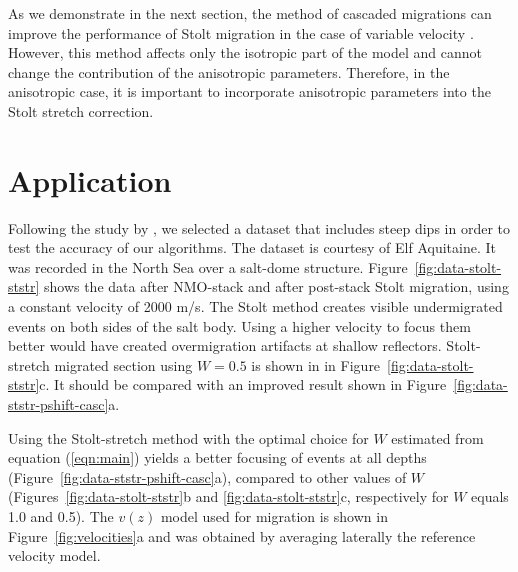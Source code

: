 As we demonstrate in the next section, the method of cascaded
migrations \cite{GEO52.05.06180643} can improve the performance of
Stolt migration in the case of variable velocity
\cite{GEO53.07.08810893}.  However, this method affects only the
isotropic part of the model and cannot change the contribution of the
anisotropic parameters.  Therefore, in the anisotropic case, it is
important to incorporate anisotropic parameters into the Stolt stretch
correction.

\section{Application}

Following the study by , we selected a
dataset that includes steep dips in order to test the accuracy of our
algorithms. The dataset is courtesy of Elf Aquitaine.  It was recorded
in the North Sea over a salt-dome structure.
Figure~\ref{fig:data-stolt-ststr} shows the data after NMO-stack and
after post-stack Stolt migration, using a constant velocity of 2000
m/s. The Stolt method creates visible undermigrated events on both
sides of the salt body. Using a higher velocity to focus them better
would have created overmigration artifacts at shallow reflectors.
Stolt-stretch migrated section using $W=0.5$ is shown in in
Figure~\ref{fig:data-stolt-ststr}c. It should be compared with an
improved result shown in Figure~\ref{fig:data-ststr-pshift-casc}a.
\par
Using the Stolt-stretch method with the optimal choice for $W$
estimated from equation (\ref{eqn:main}) yields a better focusing of
events at all depths (Figure~\ref{fig:data-ststr-pshift-casc}a),
compared to other values of $W$ (Figures~\ref{fig:data-stolt-ststr}b
and \ref{fig:data-stolt-ststr}c, respectively for $W$ equals 1.0 and
0.5).  The $v(z)$ model used for migration is shown in
Figure~\ref{fig:velocities}a and was obtained by averaging laterally
the reference velocity model.





